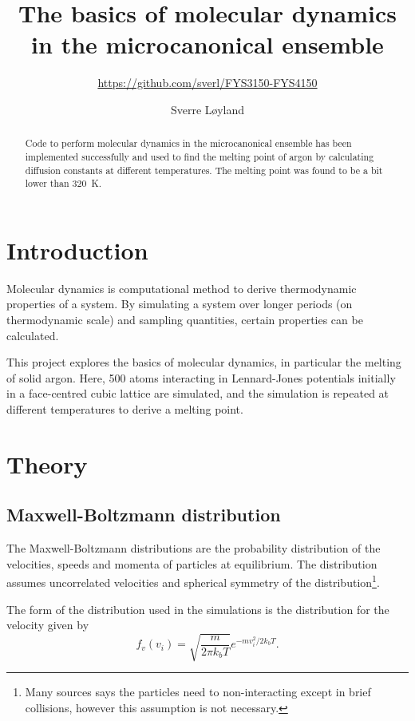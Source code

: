 \documentclass[fleqn]{scrartcl}
\begin{document}
	\title{The basics of molecular dynamics in the microcanonical ensemble}
	\subtitle{\url{https://github.com/sverl/FYS3150-FYS4150}}
	\author{Sverre Løyland}
	\maketitle
	
	\begin{abstract}
		Code to perform molecular dynamics in the microcanonical ensemble has been implemented successfully and used to find the melting point of argon by calculating diffusion constants at different temperatures. The melting point was found to be a bit lower than \SI{320}{K}. 
	\end{abstract}

	\section{Introduction}
	Molecular dynamics is computational method to derive thermodynamic properties of a system. By simulating a system over longer periods (on thermodynamic scale) and sampling quantities, certain properties can be calculated.
	
	This project explores the basics of molecular dynamics, in particular the melting of solid argon. Here, 500  atoms interacting in Lennard-Jones potentials initially in a face-centred cubic lattice are simulated, and the simulation is repeated at different temperatures to derive a melting point.
	
	\section{Theory}
	\subsection{Maxwell-Boltzmann distribution}
	The Maxwell-Boltzmann distributions are the probability distribution of the velocities, speeds and momenta of particles at equilibrium. The distribution assumes uncorrelated velocities and spherical symmetry of the distribution\footnote{Many sources says the particles need to non-interacting except in brief collisions, however this assumption is not necessary.}.
	
	The form of the distribution used in the simulations is the distribution for the velocity given by
	\begin{equation}
		f_v(v_i) = \sqrt{\frac{m}{2\pi k_bT}}e^{-mv_i^2/2k_bT}.
	\end{equation}
	
\end{document}
